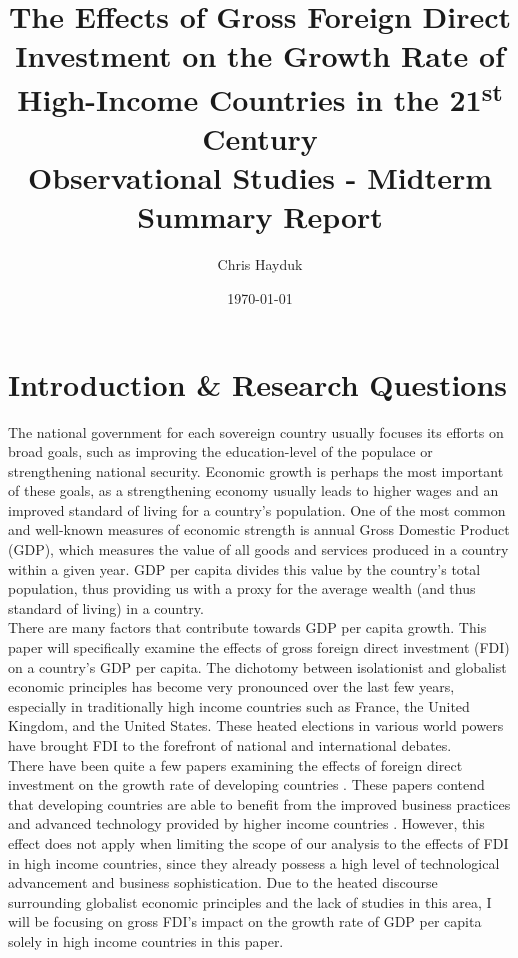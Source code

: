 \documentclass{article}
\title{The Effects of Gross Foreign Direct Investment on the Growth Rate of High-Income Countries in the 21\textsuperscript{st} Century\\
\large Observational Studies - Midterm Summary Report}
\author{Chris Hayduk}
\date{\today}
\begin{document}

\doublespacing

\maketitle

\section{Introduction \& Research Questions}
\quad The national government for each sovereign country usually focuses its efforts on broad goals, such as improving the education-level of the populace or strengthening national security. Economic growth is perhaps the most important of these goals, as a strengthening economy usually leads to higher wages and an improved standard of living for a country's population. One of the most common and well-known measures of economic strength is annual Gross Domestic Product (GDP), which measures the value of all goods and services produced in a country within a given year. GDP per capita divides this value by the country's total population, thus providing us with a proxy for the average wealth (and thus standard of living) in a country.\\
\null\quad There are many factors that contribute towards GDP per capita growth. This paper will specifically examine the effects of gross foreign direct investment (FDI) on a country's GDP per capita. The dichotomy between isolationist and globalist economic principles has become very pronounced over the last few years, especially in traditionally high income countries such as France, the United Kingdom, and the United States. These heated elections in various world powers have brought FDI to the forefront of national and international debates.\\
\null\quad There have been quite a few papers examining the effects of foreign direct investment on the growth rate of developing countries \cite{borensztein, hansen}. These papers contend that developing countries are able to benefit from the improved business practices and advanced technology provided by higher income countries \cite{borensztein}. However, this effect does not apply when limiting the scope of our analysis to the effects of FDI in high income countries, since they already possess a high level of technological advancement and business sophistication. Due to the heated discourse surrounding globalist economic principles and the lack of studies in this area, I will be focusing on gross FDI's impact on the growth rate of GDP per capita solely in high income countries in this paper.
\end{document}
